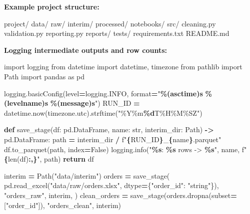 \documentclass[
  12pt,
]{article}
\newenvironment{Shaded}{\begin{snugshade}}{\end{snugshade}}
\newcommand{\BuiltInTok}[1]{#1}
\newcommand{\ControlFlowTok}[1]{\textcolor[rgb]{0.13,0.29,0.53}{\textbf{#1}}}
\newcommand{\ImportTok}[1]{#1}
\newcommand{\KeywordTok}[1]{\textcolor[rgb]{0.13,0.29,0.53}{\textbf{#1}}}
\newcommand{\NormalTok}[1]{#1}
\newcommand{\OperatorTok}[1]{\textcolor[rgb]{0.81,0.36,0.00}{\textbf{#1}}}
\newcommand{\SpecialCharTok}[1]{\textcolor[rgb]{0.81,0.36,0.00}{\textbf{#1}}}
\newcommand{\SpecialStringTok}[1]{\textcolor[rgb]{0.31,0.60,0.02}{#1}}
\newcommand{\StringTok}[1]{\textcolor[rgb]{0.31,0.60,0.02}{#1}}
\newcommand{\VariableTok}[1]{\textcolor[rgb]{0.00,0.00,0.00}{#1}}
\begin{document}
\textbf{Example project structure:}

\begin{Shaded}
\begin{Highlighting}[]
\NormalTok{project/}
\NormalTok{  data/}
\NormalTok{    raw/}
\NormalTok{    interim/}
\NormalTok{    processed/}
\NormalTok{  notebooks/}
\NormalTok{  src/}
\NormalTok{    cleaning.py}
\NormalTok{    validation.py}
\NormalTok{    reporting.py}
\NormalTok{  reports/}
\NormalTok{  tests/}
\NormalTok{  requirements.txt}
\NormalTok{  README.md}
\end{Highlighting}
\end{Shaded}

\textbf{Logging intermediate outputs and row counts:}

\begin{Shaded}
\begin{Highlighting}[]
\ImportTok{import}\NormalTok{ logging}
\ImportTok{from}\NormalTok{ datetime }\ImportTok{import}\NormalTok{ datetime, timezone}
\ImportTok{from}\NormalTok{ pathlib }\ImportTok{import}\NormalTok{ Path}
\ImportTok{import}\NormalTok{ pandas }\ImportTok{as}\NormalTok{ pd}

\NormalTok{logging.basicConfig(level}\OperatorTok{=}\NormalTok{logging.INFO, }\BuiltInTok{format}\OperatorTok{=}\StringTok{"}\SpecialCharTok{\%(asctime)s}\StringTok{ }\SpecialCharTok{\%(levelname)s}\StringTok{ }\SpecialCharTok{\%(message)s}\StringTok{"}\NormalTok{)}
\NormalTok{RUN\_ID }\OperatorTok{=}\NormalTok{ datetime.now(timezone.utc).strftime(}\StringTok{"\%Y\%m}\SpecialCharTok{\%d}\StringTok{T\%H\%M\%SZ"}\NormalTok{)}

\KeywordTok{def}\NormalTok{ save\_stage(df: pd.DataFrame, name: }\BuiltInTok{str}\NormalTok{, interim\_dir: Path) }\OperatorTok{{-}\textgreater{}}\NormalTok{ pd.DataFrame:}
\NormalTok{    path }\OperatorTok{=}\NormalTok{ interim\_dir }\OperatorTok{/} \SpecialStringTok{f"}\SpecialCharTok{\{}\NormalTok{RUN\_ID}\SpecialCharTok{\}}\SpecialStringTok{\_}\SpecialCharTok{\{}\NormalTok{name}\SpecialCharTok{\}}\SpecialStringTok{.parquet"}
\NormalTok{    df.to\_parquet(path, index}\OperatorTok{=}\VariableTok{False}\NormalTok{)}
\NormalTok{    logging.info(}\StringTok{"}\SpecialCharTok{\%s}\StringTok{: }\SpecialCharTok{\%s}\StringTok{ rows {-}\textgreater{} }\SpecialCharTok{\%s}\StringTok{"}\NormalTok{, name, }\SpecialStringTok{f"}\SpecialCharTok{\{}\BuiltInTok{len}\NormalTok{(df)}\SpecialCharTok{:,\}}\SpecialStringTok{"}\NormalTok{, path)}
    \ControlFlowTok{return}\NormalTok{ df}

\NormalTok{interim }\OperatorTok{=}\NormalTok{ Path(}\StringTok{"data/interim"}\NormalTok{)}
\NormalTok{orders }\OperatorTok{=}\NormalTok{ save\_stage(}
\NormalTok{    pd.read\_excel(}\StringTok{"data/raw/orders.xlsx"}\NormalTok{, dtype}\OperatorTok{=}\NormalTok{\{}\StringTok{"order\_id"}\NormalTok{: }\StringTok{"string"}\NormalTok{\}),}
    \StringTok{"orders\_raw"}\NormalTok{,}
\NormalTok{    interim,}
\NormalTok{)}
\NormalTok{clean\_orders }\OperatorTok{=}\NormalTok{ save\_stage(orders.dropna(subset}\OperatorTok{=}\NormalTok{[}\StringTok{"order\_id"}\NormalTok{]), }\StringTok{"orders\_clean"}\NormalTok{, interim)}
\end{Highlighting}
\end{Shaded}
\end{document}
